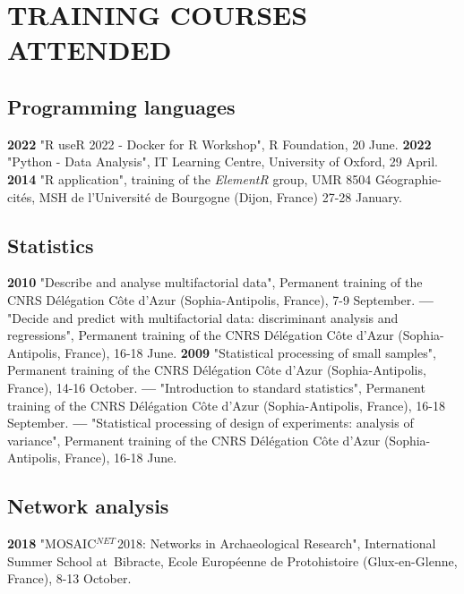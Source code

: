 \documentclass{article}
\begin{document}
\section*{TRAINING COURSES ATTENDED}

\subsection*{Programming languages}

\textbf{2022 }"\textsf{R} useR 2022 - Docker for R Workshop", R Foundation, 20 June.
\smallbreak
\textbf{2022 }"\textsf{Python} - Data Analysis", IT Learning Centre, University of Oxford, 29 April.
\smallbreak
\textbf{2014 }"\textsf{R} application", training of the \textit{ElementR} group, UMR 8504 G\'{e}ographie-cit\'{e}s, MSH de l'Universit\'{e} de Bourgogne (Dijon, France) 27-28 January.
\smallbreak

\subsection*{Statistics }

\textbf{2010 }"Describe and analyse multifactorial data", Permanent training of the CNRS D\'{e}l\'{e}gation C\^{o}te d'Azur (Sophia-Antipolis, France), 7-9 September.
\smallbreak
\textbf{--- }"Decide and predict with multifactorial data: discriminant analysis and regressions", Permanent training of the CNRS D\'{e}l\'{e}gation C\^{o}te d'Azur (Sophia-Antipolis, France), 16-18 June.
\smallbreak
\textbf{2009 }"Statistical processing of small samples", Permanent training of the CNRS D\'{e}l\'{e}gation C\^{o}te d'Azur (Sophia-Antipolis, France), 14-16 October.
\smallbreak
\textbf{--- }"Introduction to standard statistics", Permanent training of the CNRS D\'{e}l\'{e}gation C\^{o}te d'Azur (Sophia-Antipolis, France), 16-18 September.
\smallbreak
\textbf{--- }"Statistical processing of design of experiments: analysis of variance", Permanent training of the CNRS D\'{e}l\'{e}gation C\^{o}te d'Azur (Sophia-Antipolis, France), 16-18 June.
\smallbreak

\subsection*{Network analysis}

\textbf{2018 }"MOSAIC${}^{NET\ }$2018: Networks in Archaeological Research", International Summer School at~Bibracte, Ecole Europ\'{e}enne de Protohistoire (Glux-en-Glenne, France), 8-13 October.
\end{document}
